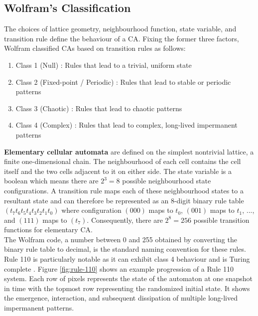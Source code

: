 \subsection{Wolfram's Classification}

The choices of lattice geometry, neighbourhood function, state variable, and transition rule define the behaviour of a CA. Fixing the former three factors, Wolfram \cite{wolfram1986theory} classified CAs based on transition rules as follows:
\begin{enumerate}
  \item Class 1 (Null) : Rules that lead to a trivial, uniform state
  \item Class 2 (Fixed-point / Periodic) : Rules that lead to stable or periodic patterns
  \item Class 3 (Chaotic) : Rules that lead to chaotic patterns
  \item Class 4 (Complex) : Rules that lead to complex, long-lived impermanent patterns
\end{enumerate}

\textbf{Elementary cellular automata} are defined on the simplest nontrivial lattice, a finite one-dimensional chain. The neighbourhood of each cell contains the cell itself and the two cells adjacent to it on either side. The state variable is a boolean which means there are $2^3 = 8$ possible neighbourhood state configurations. A transition rule maps each of these neighbourhood states to a resultant state and can therefore be represented as an 8-digit binary rule table $(t_7t_6t_5t_4t_3t_2t_1t_0)$ where configuration $(000)$ maps to $t_0$, $(001)$ maps to $t_1$, ..., and $(111)$ maps to $(t_7)$. Consequently, there are $2^8=256$ possible transition functions for elementary CA.\\

The Wolfram code, a number between 0 and 255 obtained by converting the binary rule table to decimal, is the standard naming convention for these rules. Rule 110 is particularly notable as it can exhibit class 4 behaviour \cite{wolfram2002} and is Turing complete \cite{cook2004universality}. Figure \ref{fig:rule-110} shows an example progression of a Rule 110 system. Each row of pixels represents the state of the automaton at one snapshot in time with the topmost row representing the randomized initial state. It shows the emergence, interaction, and subsequent dissipation of multiple long-lived impermanent patterns.

